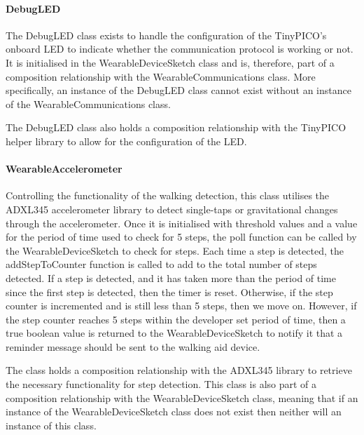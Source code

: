                         \paragraph{DebugLED}\mbox{}
        
                            The DebugLED class exists to handle the configuration of the TinyPICO's onboard LED to indicate whether the communication protocol is working or not. It is initialised in the WearableDeviceSketch class and is, therefore, part of a composition relationship with the WearableCommunications class. More specifically, an instance of the DebugLED class cannot exist without an instance of the WearableCommunications class.
        
                            The DebugLED class also holds a composition relationship with the TinyPICO helper library to allow for the configuration of the LED.
        
                        \paragraph{WearableAccelerometer}\mbox{}
        
                            Controlling the functionality of the walking detection, this class utilises the ADXL345 accelerometer library to detect single-taps or gravitational changes through the accelerometer. Once it is initialised with threshold values and a value for the period of time used to check for 5 steps, the poll function can be called by the WearableDeviceSketch to check for steps. Each time a step is detected, the addStepToCounter function is called to add to the total number of steps detected. If a step is detected, and it has taken more than the period of time since the first step is detected, then the timer is reset. Otherwise, if the step counter is incremented and is still less than 5 steps, then we move on. However, if the step counter reaches 5 steps within the developer set period of time, then a true boolean value is returned to the WearableDeviceSketch to notify it that a reminder message should be sent to the walking aid device.
        
                            The class holds a composition relationship with the ADXL345 library to retrieve the necessary functionality for step detection. This class is also part of a composition relationship with the WearableDeviceSketch class, meaning that if an instance of the WearableDeviceSketch class does not exist then neither will an instance of this class. 
        
